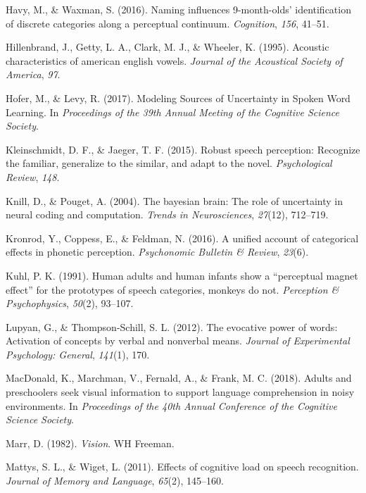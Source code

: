 \documentclass[english,,man,floatsintext]{apa6}
\theoremstyle{definition}
\theoremstyle{definition}
\theoremstyle{definition}
\theoremstyle{remark}
\begin{document}
\hypertarget{ref-havy2016}{}
Havy, M., \& Waxman, S. (2016). Naming influences 9-month-olds'
identification of discrete categories along a perceptual continuum.
\emph{Cognition}, \emph{156}, 41--51.

\hypertarget{ref-hillenbrand1995}{}
Hillenbrand, J., Getty, L. A., Clark, M. J., \& Wheeler, K. (1995).
Acoustic characteristics of american english vowels. \emph{Journal of
the Acoustical Society of America}, \emph{97}.

\hypertarget{ref-hofer2017}{}
Hofer, M., \& Levy, R. (2017). Modeling Sources of Uncertainty in Spoken
Word Learning. In \emph{Proceedings of the 39th Annual Meeting of the
Cognitive Science Society}.

\hypertarget{ref-kleinschmidt2015}{}
Kleinschmidt, D. F., \& Jaeger, T. F. (2015). Robust speech perception:
Recognize the familiar, generalize to the similar, and adapt to the
novel. \emph{Psychological Review}, \emph{148}.

\hypertarget{ref-Knill04}{}
Knill, D., \& Pouget, A. (2004). The bayesian brain: The role of
uncertainty in neural coding and computation. \emph{Trends in
Neurosciences}, \emph{27}(12), 712--719.

\hypertarget{ref-kronrod2016}{}
Kronrod, Y., Coppess, E., \& Feldman, N. (2016). A unified account of
categorical effects in phonetic perception. \emph{Psychonomic Bulletin
\& Review}, \emph{23}(6).

\hypertarget{ref-kuhl1991}{}
Kuhl, P. K. (1991). Human adults and human infants show a ``perceptual
magnet effect'' for the prototypes of speech categories, monkeys do not.
\emph{Perception \& Psychophysics}, \emph{50}(2), 93--107.

\hypertarget{ref-lupyan2012}{}
Lupyan, G., \& Thompson-Schill, S. L. (2012). The evocative power of
words: Activation of concepts by verbal and nonverbal means.
\emph{Journal of Experimental Psychology: General}, \emph{141}(1), 170.

\hypertarget{ref-macdonald2018}{}
MacDonald, K., Marchman, V., Fernald, A., \& Frank, M. C. (2018). Adults
and preschoolers seek visual information to support language
comprehension in noisy environments. In \emph{Proceedings of the 40th
Annual Conference of the Cognitive Science Society}.

\hypertarget{ref-marr1982}{}
Marr, D. (1982). \emph{Vision}. WH Freeman.

\hypertarget{ref-mattys11}{}
Mattys, S. L., \& Wiget, L. (2011). Effects of cognitive load on speech
recognition. \emph{Journal of Memory and Language}, \emph{65}(2),
145--160.
\end{document}
